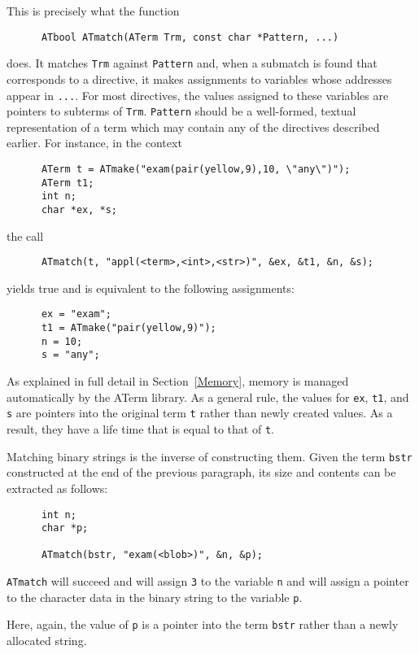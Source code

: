 \documentclass[twoside]{article} %
\begin{document}
\noindent This is precisely what the function
\begin{verbatim}
      ATbool ATmatch(ATerm Trm, const char *Pattern, ...)
\end{verbatim}
does. It matches {\tt Trm} against {\tt Pattern} and, when a submatch
is found that corresponds to a directive, it makes assignments to
variables whose addresses appear in {\tt ...}.
For most directives, the values assigned to these variables are pointers to
subterms of {\tt Trm}.
{\tt Pattern} should
be a well-formed, textual representation of a term which may contain
any of the directives described earlier.  For instance, in the context
\begin{verbatim}
      ATerm t = ATmake("exam(pair(yellow,9),10, \"any\")");
      ATerm t1;
      int n;
      char *ex, *s;
\end{verbatim}
the call 
\begin{verbatim}
      ATmatch(t, "appl(<term>,<int>,<str>)", &ex, &t1, &n, &s);
\end{verbatim}
yields true and is equivalent to the following assignments:
\begin{verbatim}
      ex = "exam";
      t1 = ATmake("pair(yellow,9)");
      n = 10;
      s = "any";
\end{verbatim}
As explained in full detail in Section~\ref{Memory}, memory is managed
automatically by the ATerm library.  As a general rule, the values for {\tt ex},
{\tt t1}, and {\tt s} are pointers into the original term {\tt t}
rather than newly created values. As a result, they have a life time
that is equal to that of {\tt t}.

Matching binary strings is the inverse of constructing them. Given
the term {\tt bstr} constructed at the end of the previous paragraph,
its size and contents can be extracted as follows:
\begin{verbatim}
      int n;
      char *p;

      ATmatch(bstr, "exam(<blob>)", &n, &p);
\end{verbatim}
{\tt ATmatch} will succeed and will assign {\tt 3} to the variable
{\tt n} and will assign a pointer to the character data in the binary
string to the variable {\tt p}.

Here, again, the value of {\tt p} is a pointer into the term {\tt bstr}
rather than a newly allocated string.
\end{document}
